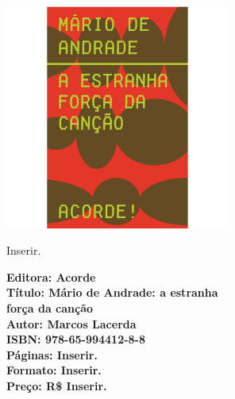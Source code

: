 \begin{center}
\hspace*{-3.6cm}
\hspace*{3.1cm}\includegraphics[width=74mm]{./CAPAS/ACORDE_MARIO.jpg}
\end{center}
\hspace*{-7cm}\hrulefill\hspace*{-7cm}
\medskip

\noindent{}Inserir.

\vfill
\hspace*{-.4cm}\begin{minipage}[c]{.5\linewidth}
\small\textbf{
\hspace*{-.1cm}Editora: Acorde\\
Título: Mário de Andrade: a estranha\\força da canção\\
Autor: Marcos Lacerda\\ 
ISBN: 978-65-994412-8-8\\
Páginas: Inserir.\\
Formato: Inserir.\\
Preço: R\$ Inserir.\\
}
\end{minipage}




